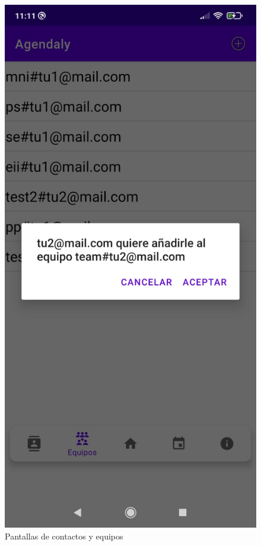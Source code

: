 \documentclass[a4paper,openright,12pt]{article}
\begin{document}
\begin{figure}
    \includegraphics[scale=0.05]{addToTeamDialog.jpeg}\hfill
    \caption{Pantallas de contactos y equipos}
\end{figure}
\newpage
\end{document}
